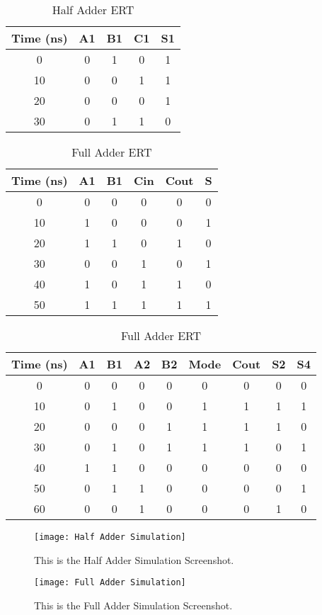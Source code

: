 \documentclass[11pt]{article}
\begin{document}
\begin{table}[ht]\centering
	\caption{Half Adder ERT}
	\label{tbl:Half_Adder_ERT}
	\begin{tabular}{c||cc|cc}
		\toprule
		Time (ns) & A1 & B1 & C1 & S1\\
		\midrule
		0 & 0 & 1 & 0 & 1\\
		10 & 0 & 0 & 1 & 1\\
		20 & 0 & 0 & 0 & 1\\
		30 & 0 & 1 & 1 & 0\\
		\bottomrule
	\end{tabular} 
\end{table} 

\begin{table}[ht]\centering
	\caption{Full Adder ERT}
	\label{tbl:Half_Adder_ERT}
	\begin{tabular}{c||ccc|cc}
		\toprule
		Time (ns) & A1 & B1 & Cin & Cout & S\\
		\midrule
		0 & 0 & 0 & 0 & 0 & 0\\
		10 & 1 & 0 & 0 & 0 & 1\\
		20 & 1 & 1 & 0 & 1 & 0\\
		30 & 0 & 0 & 1 & 0 & 1\\
		40 & 1 & 0 & 1 & 1 & 0\\
		50 & 1 & 1 & 1 & 1 & 1\\
		\bottomrule
	\end{tabular} 
\end{table} 

\begin{table}[ht]\centering
	\caption{Full Adder ERT}
	\label{tbl:Half_Adder_ERT}
	\begin{tabular}{c||ccccc|ccc}
		\toprule
		Time (ns) & A1 & B1 & A2 & B2 & Mode & Cout & S2 & S4\\
		\midrule
		0 & 0 & 0 & 0 & 0 & 0 & 0 & 0 & 0\\
		10 & 0 & 1 & 0 & 0 & 1 & 1 & 1 & 1\\
		20 & 0 & 0 & 0 & 1 & 1 & 1 & 1 & 0\\
		30 & 0 & 1 & 0 & 1 & 1 & 1 & 0 & 1\\
		40 & 1 & 1 & 0 & 0 & 0 & 0 & 0 & 0\\
		50 & 0 & 1 & 1 & 0 & 0 & 0 & 0 & 1\\
		60 & 0 & 0 & 1 & 0 & 0 & 0 & 1 & 0\\	
		\bottomrule
	\end{tabular} 
\end{table} 

	
\begin{figure}[ht]\centering
	\texttt{[image: Half Adder Simulation]}
	\caption{This is the Half Adder Simulation Screenshot.}
	\label{fig:half_adder_sim}	
\end{figure}

\begin{figure}[ht]\centering
	\texttt{[image: Full Adder Simulation]}
	\caption{This is the Full Adder Simulation Screenshot.}
	\label{fig:full_adder_sim}	
\end{figure}
\end{document}
